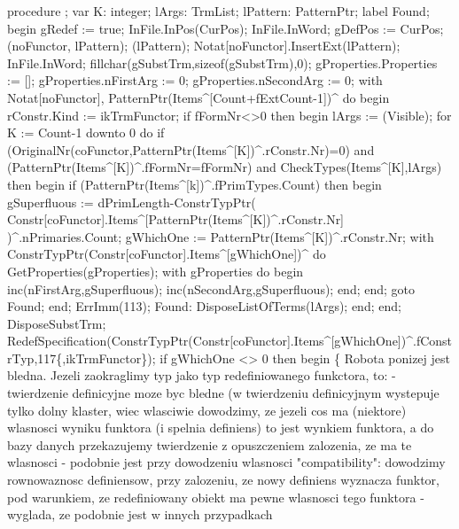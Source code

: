 \nwenddocs{}\endmoddef\nwstartdeflinemarkup{}\nwenddeflinemarkup
procedure ;
var
   K: integer;
   lArgs: TrmList;
   lPattern: PatternPtr;
label Found;
begin
   gRedef := true;
   InFile.InPos(CurPos); InFile.InWord;
   gDefPos := CurPos;
   (noFunctor, lPattern);
   (lPattern);
   Notat[noFunctor].InsertExt(lPattern);
   InFile.InWord;
   fillchar(gSubstTrm,sizeof(gSubstTrm),0);
   gProperties.Properties := [];
   gProperties.nFirstArg := 0;
   gProperties.nSecondArg := 0;
   with Notat[noFunctor], PatternPtr(Items^[Count+fExtCount-1])^ do
   begin
      rConstr.Kind := ikTrmFunctor;
      if fFormNr<>0 then
      begin
         lArgs := (Visible);
         for K := Count-1 downto 0 do
            if (OriginalNr(coFunctor,PatternPtr(Items^[K])^.rConstr.Nr)=0) and
                  (PatternPtr(Items^[K])^.fFormNr=fFormNr) and
                  CheckTypes(Items^[K],lArgs) then
            begin
               if (PatternPtr(Items^[k])^.fPrimTypes.Count) then
               begin
                  gSuperfluous := dPrimLength-ConstrTypPtr(
                     Constr[coFunctor].Items^[PatternPtr(Items^[K])^.rConstr.Nr]
                                                          )^.nPrimaries.Count;
                  gWhichOne := PatternPtr(Items^[K])^.rConstr.Nr;
                  with ConstrTypPtr(Constr[coFunctor].Items^[gWhichOne])^ do
                     GetProperties(gProperties);
                  with gProperties do
                  begin
                     inc(nFirstArg,gSuperfluous);
                     inc(nSecondArg,gSuperfluous);
                  end;
               end;
               goto Found;
            end;
         ErrImm(113);
         Found:
            DisposeListOfTerms(lArgs);
      end;
   end;
   DisposeSubstTrm;
   RedefSpecification(ConstrTypPtr(Constr[coFunctor].Items^[gWhichOne])^.fConstrTyp,117\{,ikTrmFunctor\});
   if gWhichOne <> 0 then
   begin
      \{ Robota ponizej jest bledna. Jezeli zaokraglimy typ jako
        typ redefiniowanego funkctora, to:
        - twierdzenie definicyjne moze byc bledne (w twierdzeniu
        definicyjnym wystepuje tylko dolny klaster, wiec wlasciwie
        dowodzimy, ze jezeli cos ma (niektore) wlasnosci wyniku
        funktora (i spelnia definiens) to jest wynkiem funktora,
        a do bazy danych przekazujemy twierdzenie z opuszczeniem
        zalozenia, ze ma te wlasnosci
        - podobnie jest przy dowodzeniu wlasnosci "compatibility":
        dowodzimy rownowaznosc definiensow, przy zalozeniu, ze
        nowy definiens wyznacza funktor, pod warunkiem, ze
        redefiniowany obiekt ma pewne wlasnosci tego funktora
        - wyglada, ze podobnie jest w innych przypadkach
      
